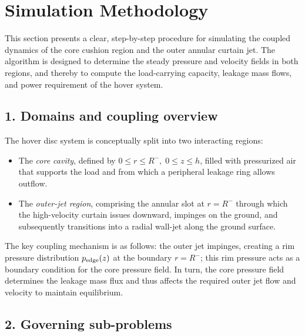 \documentclass[11pt,a4paper]{article}
\begin{document}
\section{Simulation Methodology}
\label{sec:simulation-method}

This section presents a clear, step-by-step procedure for simulating the coupled dynamics of the core cushion region and the outer annular curtain jet. The algorithm is designed to determine the steady pressure and velocity fields in both regions, and thereby to compute the load-carrying capacity, leakage mass flows, and power requirement of the hover system.

\subsection*{1. Domains and coupling overview}
The hover disc system is conceptually split into two interacting regions:
\begin{itemize}
  \item The \emph{core cavity}, defined by \(0 \le r \le R^{-},\;0 \le z \le h\), filled with pressurized air that supports the load and from which a peripheral leakage ring allows outflow.
  \item The \emph{outer-jet region}, comprising the annular slot at \(r=R^{-}\) through which the high-velocity curtain issues downward, impinges on the ground, and subsequently transitions into a radial wall-jet along the ground surface.
\end{itemize}
The key coupling mechanism is as follows: the outer jet impinges, creating a rim pressure distribution \(p_{\rm edge}(z)\) at the boundary \(r=R^{-}\); this rim pressure acts as a boundary condition for the core pressure field. In turn, the core pressure field determines the leakage mass flux and thus affects the required outer jet flow and velocity to maintain equilibrium.

\subsection*{2. Governing sub-problems}
\end{document}
